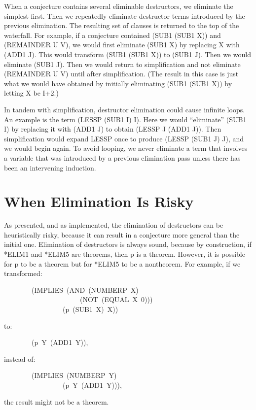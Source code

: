 \documentclass[11pt]{book}
\newenvironment{pubasis}{\begin{flushleft}\ttfamily\small}{\normalsize\rmfamily\end{flushleft}}
\newcommand{\pubdefaulttextsize}{\large}
\begin{document}
When a conjecture contains several eliminable destructors, we eliminate
the simplest first.  Then we repeatedly eliminate destructor
terms introduced by the previous elimination.  The resulting
set of clauses is returned to the top of the waterfall.
For example, if a conjecture contained (SUB1 (SUB1 X)) and
(REMAINDER U V), we would first eliminate
(SUB1 X) by replacing X with (ADD1 J).  This would transform (SUB1 (SUB1 X))
to (SUB1 J).  Then we would eliminate (SUB1 J).
Then we would return to simplification and not eliminate
(REMAINDER U V) until after simplification.
(The result in this case is just
what we would have obtained by initially eliminating (SUB1 (SUB1 X)) by
letting X be I+2.)

In tandem
with simplification, destructor elimination could cause infinite loops.
An example is the term (LESSP (SUB1 I) I).  Here we
would ``eliminate'' (SUB1 I) by replacing it with (ADD1 J) to obtain
(LESSP J (ADD1 J)).  Then simplification would expand LESSP once to
produce (LESSP (SUB1 J) J), and we would begin again. To avoid looping,
we
never eliminate a term that involves a
variable that was introduced by a previous elimination pass
unless there has been an intervening induction.
\section{When Elimination Is Risky}
\label{SSECWHENELIMINATIONISRISKY}
\pubdefaulttextsize
As presented, and as implemented, the elimination of destructors
can be heuristically risky, because it
can result in a conjecture more general than the initial one.
Elimination of destructors is always sound, because
by construction, if *ELIM1 and *ELIM5 are theorems, then p is a theorem.
However, it is possible for p to be a theorem but for *ELIM5
to be a nontheorem.  For example, if we
transformed:
\begin{pubasis}
~~~~~~~~(IMPLIES~(AND~(NUMBERP~X)\\
~~~~~~~~~~~~~~~~~~~~~~(NOT~(EQUAL~X~0)))\\
~~~~~~~~~~~~~~~~~(p~(SUB1~X)~X))\\
\end{pubasis}
to:
\begin{pubasis}
~~~~~~~~(p~Y~(ADD1~Y)),\\
\end{pubasis}
instead of:
\begin{pubasis}
~~~~~~~~(IMPLIES~(NUMBERP~Y)\\
~~~~~~~~~~~~~~~~~(p~Y~(ADD1~Y))),\\
\end{pubasis}
the result might not be a theorem.
\end{document}
